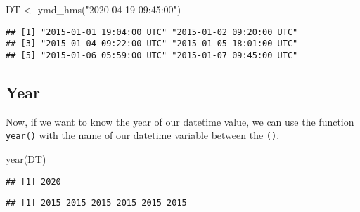 \documentclass[
]{book}
\newenvironment{Shaded}{\begin{snugshade}}{\end{snugshade}}
\newcommand{\FunctionTok}[1]{\textcolor[rgb]{0.00,0.00,0.00}{#1}}
\newcommand{\NormalTok}[1]{#1}
\newcommand{\OtherTok}[1]{\textcolor[rgb]{0.56,0.35,0.01}{#1}}
\newcommand{\SpecialCharTok}[1]{\textcolor[rgb]{0.00,0.00,0.00}{#1}}
\newcommand{\StringTok}[1]{\textcolor[rgb]{0.31,0.60,0.02}{#1}}
\begin{document}
\begin{Shaded}
\begin{Highlighting}[]
\NormalTok{DT }\OtherTok{\textless{}{-}} \FunctionTok{ymd\_hms}\NormalTok{(}\StringTok{"2020{-}04{-}19 09:45:00"}\NormalTok{)}
\end{Highlighting}
\end{Shaded}

\begin{Shaded}
\end{Shaded}

\begin{verbatim}
## [1] "2015-01-01 19:04:00 UTC" "2015-01-02 09:20:00 UTC"
## [3] "2015-01-04 09:22:00 UTC" "2015-01-05 18:01:00 UTC"
## [5] "2015-01-06 05:59:00 UTC" "2015-01-07 09:45:00 UTC"
\end{verbatim}

\hypertarget{year}{%
\subsection{Year}\label{year}}

Now, if we want to know the year of our datetime value, we can use the function \texttt{year()} with the name of our datetime variable between the \texttt{()}.

\begin{Shaded}
\begin{Highlighting}[]
\FunctionTok{year}\NormalTok{(DT)}
\end{Highlighting}
\end{Shaded}

\begin{verbatim}
## [1] 2020
\end{verbatim}

\begin{Shaded}
\end{Shaded}

\begin{verbatim}
## [1] 2015 2015 2015 2015 2015 2015
\end{verbatim}
\end{document}
